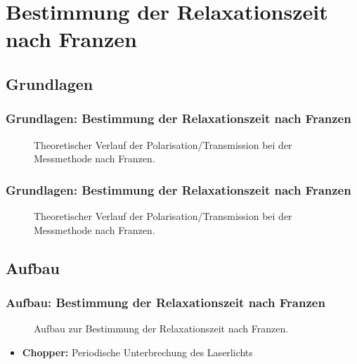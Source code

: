 
\section{Bestimmung der Relaxationszeit nach Franzen}
\subsection{Grundlagen}

\begin{frame}
\frametitle{Grundlagen: Bestimmung der Relaxationszeit nach Franzen}

\begin{figure}
    \centering
    \def\svgwidth{\textwidth}
    
    \caption{Theoretischer Verlauf der Polarisation/Transmission bei der Messmethode nach Franzen.}
\end{figure}

  
\end{frame}


\begin{frame}[noframenumbering]
\frametitle{Grundlagen: Bestimmung der Relaxationszeit nach Franzen}

\addtocounter{figure}{-1}
\begin{figure}
    \centering
    \def\svgwidth{\textwidth}
    
    \caption{Theoretischer Verlauf der Polarisation/Transmission bei der Messmethode nach Franzen.}
\end{figure}

  
\end{frame}

\subsection{Aufbau}
\begin{frame}
\frametitle{Aufbau: Bestimmung der Relaxationszeit nach Franzen}

\begin{figure}
    \centering
    \def\svgwidth{\textwidth}
    
    \caption{Aufbau zur Bestimmung der Relaxationszeit nach Franzen.}
\end{figure}

\begin{itemize}
  \item \textbf{Chopper:} Periodische Unterbrechung des Laserlichts
\end{itemize}

\end{frame}

